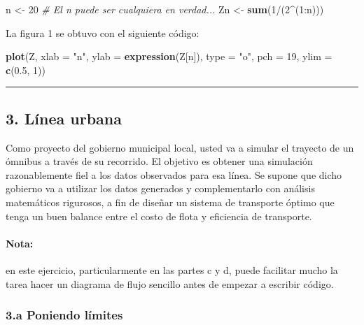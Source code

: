 \documentclass[]{article}
\newenvironment{Shaded}{}{}
\newcommand{\KeywordTok}[1]{\textcolor[rgb]{0.00,0.44,0.13}{\textbf{{#1}}}}
\newcommand{\DataTypeTok}[1]{\textcolor[rgb]{0.56,0.13,0.00}{{#1}}}
\newcommand{\DecValTok}[1]{\textcolor[rgb]{0.25,0.63,0.44}{{#1}}}
\newcommand{\FloatTok}[1]{\textcolor[rgb]{0.25,0.63,0.44}{{#1}}}
\newcommand{\StringTok}[1]{\textcolor[rgb]{0.25,0.44,0.63}{{#1}}}
\newcommand{\CommentTok}[1]{\textcolor[rgb]{0.38,0.63,0.69}{\textit{{#1}}}}
\newcommand{\NormalTok}[1]{{#1}}
\begin{document}
\begin{Shaded}
\begin{Highlighting}[]
\NormalTok{n <- }\DecValTok{20}  \CommentTok{# El n puede ser cualquiera en verdad...}
\NormalTok{Zn <- }\KeywordTok{sum}\NormalTok{(}\DecValTok{1}\NormalTok{/(}\DecValTok{2}\NormalTok{^(}\DecValTok{1}\NormalTok{:n)))}
\end{Highlighting}
\end{Shaded}
La figura 1 se obtuvo con el siguiente código:

\begin{Shaded}
\begin{Highlighting}[]
\KeywordTok{plot}\NormalTok{(Z, }\DataTypeTok{xlab =} \StringTok{"n"}\NormalTok{, }\DataTypeTok{ylab =} \KeywordTok{expression}\NormalTok{(Z[n]), }\DataTypeTok{type =} \StringTok{"o"}\NormalTok{, }\DataTypeTok{pch =} \DecValTok{19}\NormalTok{, }\DataTypeTok{ylim =} \KeywordTok{c}\NormalTok{(}\FloatTok{0.5}\NormalTok{, }
    \DecValTok{1}\NormalTok{))}
\end{Highlighting}
\end{Shaded}
\begin{center}\rule{3in}{0.4pt}\end{center}

\subsection{3. Línea urbana}

Como proyecto del gobierno municipal local, usted va a simular el
trayecto de un ómnibus a través de su recorrido. El objetivo es obtener
una simulación razonablemente fiel a los datos observados para esa
línea. Se supone que dicho gobierno va a utilizar los datos generados y
complementarlo con análisis matemáticos rigurosos, a fin de diseñar un
sistema de transporte óptimo que tenga un buen balance entre el costo de
flota y eficiencia de transporte.

\paragraph{Nota:}

en este ejercicio, particularmente en las partes c y d, puede facilitar
mucho la tarea hacer un diagrama de flujo sencillo antes de empezar a
escribir código.

\subsubsection{3.a Poniendo límites}
\end{document}

